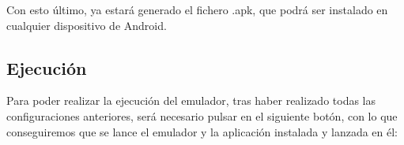 Con esto último, ya estará generado el fichero .apk, que podrá ser instalado en cualquier dispositivo de Android.

\subsection{Ejecución}

Para poder realizar la ejecución del emulador, tras haber realizado todas las configuraciones anteriores, será necesario pulsar en el siguiente botón, con lo que conseguiremos que se lance el emulador y la aplicación instalada y lanzada en él:

